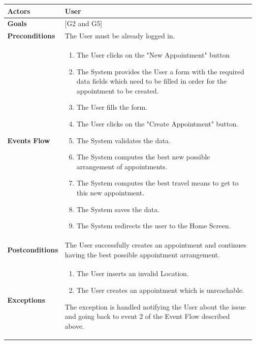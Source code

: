 \documentclass[12pt]{article}
\begin{document}
\begin{center}
    \begin{tabular} { |p{}|p{}| }
        \hline
        \textbf{Actors} & User \\ 
        \hline
        \textbf{Goals} & {[G2 and G5]} \\ 
        \hline  
        \textbf{Preconditions} & The User must be already logged in. \\ 
        \hline
        \textbf{Events Flow} & \begin{enumerate}[topsep=0pt] 
                            \setlength{\itemsep}{0.5pt}
                            \item The User clicks on the "New Appointment" button
                            \item The System provides the User a form with the required data fields which need to be filled in order for the appointment to be created.
                            \item The User fills the form.
                            \item The User clicks on the "Create Appointment" button.
                            \item The System validates the data.
                            \item The System computes the best new possible arrangement of appointments.
                            \item The System computes the best travel means to get to this new appointment.
                            \item The System saves the data.
                            \item The System redirects the user to the Home Screen.
                            \end{enumerate} \\
        \hline
        \textbf{Postconditions} & The User successfully creates an appointment and continues having the best possible appointment arrangement. \\
        \hline
        \textbf{Exceptions} & \begin{enumerate}[topsep=0pt] 
                            \setlength{\itemsep}{0.5pt}
                            \item The User inserts an invalid Location.
                            \item The User creates an appointment which is unreachable.
                            \end{enumerate} 
                            The exception is handled notifying the User about the issue and going back to event 2 of the Event Flow described above.\\ 
        \hline
    \end{tabular}
\end{center}
\end{document}
